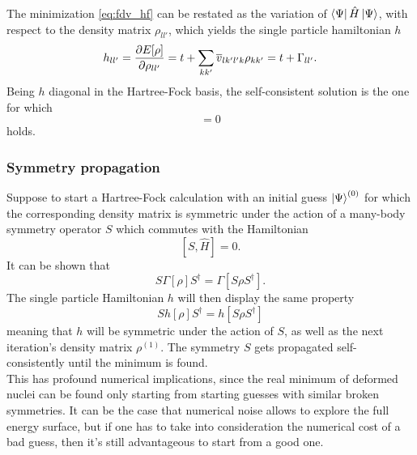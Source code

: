 The minimization \eqref{eq:fdv_hf} can be restated as the variation of $\bra{\Psi}\hat H \ket{\Psi}$, with respect to the density matrix $\rho_{ll'}$, which yields the single particle hamiltonian $h$
\begin{equation}
    \label{eq:spe_scnd}
    h_{ll'} = \pdv{E[\rho]}{\rho_{ll'}} = t + \sum_{kk'}\overline{v}_{lk'l'k}\rho_{kk'} = t+\Gamma_{ll'}.
\end{equation}
Being $h$ diagonal in the Hartree-Fock basis, the self-consistent solution is the one for which
\begin{equation}
    [h, \rho] = 0
\end{equation}
holds.
\subsubsection{Symmetry propagation}
Suppose to start a Hartree-Fock calculation with an initial guess $\ket{\Psi}^{(0)}$ for which the corresponding density matrix is symmetric under the action of a many-body symmetry operator $S$ which commutes with the Hamiltonian
\begin{equation}
    \label{eq:comm_S_H}
    [S, \hat H] = 0.
\end{equation}
It can be shown \cite{ring2004nuclear} that 
\begin{equation}
    \label{eq:comm_S_Gamma}
    S\Gamma[\rho] S^\dagger  = \Gamma[S\rho S^\dagger].
\end{equation}
The single particle Hamiltonian $h$ will then display the same property
\begin{equation}
    \label{eq:comm_h_S}
    S h[\rho] S^\dagger = h[S\rho S^\dagger]
\end{equation}
meaning that $h$ will be symmetric under the action of $S$, as well as the next iteration's density matrix $\rho^{(1)}$. The symmetry $S$ gets propagated self-consistently until the minimum is found.
\\This has profound numerical implications, since the real minimum of deformed nuclei can be found only starting from starting guesses with similar broken symmetries. It can be the case that numerical noise allows to explore the full energy surface, but if one has to take into consideration the numerical cost of a bad guess, then it's still advantageous to start from a good one.
